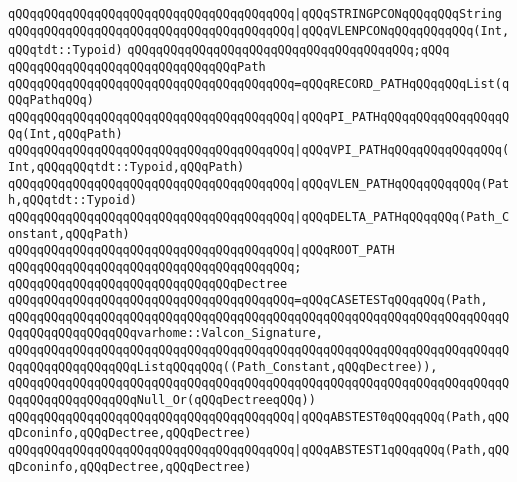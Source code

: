 \verb|qQQqqQQqqQQqqQQqqQQqqQQqqQQqqQQqqQQqqQQq|\verb#|qQQqSTRINGPCONqQQqqQQqString#\newline
\verb|qQQqqQQqqQQqqQQqqQQqqQQqqQQqqQQqqQQqqQQq|\verb#|qQQqVLENPCONqQQqqQQqqQQq(Int,qQQqtdt::Typoid)#\newline
\verb|qQQqqQQqqQQqqQQqqQQqqQQqqQQqqQQqqQQqqQQq;qQQq|\newline
\newline
\verb|qQQqqQQqqQQqqQQqqQQqqQQqqQQqqQQqPath|\newline
\verb|qQQqqQQqqQQqqQQqqQQqqQQqqQQqqQQqqQQqqQQq=qQQqRECORD_PATHqQQqqQQqList(qQQqPathqQQq)|\newline
\verb|qQQqqQQqqQQqqQQqqQQqqQQqqQQqqQQqqQQqqQQq|\verb#|qQQqPI_PATHqQQqqQQqqQQqqQQqqQQq(Int,qQQqPath)#\newline
\verb|qQQqqQQqqQQqqQQqqQQqqQQqqQQqqQQqqQQqqQQq|\verb#|qQQqVPI_PATHqQQqqQQqqQQqqQQq(Int,qQQqqQQqtdt::Typoid,qQQqPath)#\newline
\verb|qQQqqQQqqQQqqQQqqQQqqQQqqQQqqQQqqQQqqQQq|\verb#|qQQqVLEN_PATHqQQqqQQqqQQq(Path,qQQqtdt::Typoid)#\newline
\verb|qQQqqQQqqQQqqQQqqQQqqQQqqQQqqQQqqQQqqQQq|\verb#|qQQqDELTA_PATHqQQqqQQq(Path_Constant,qQQqPath)#\newline
\verb|qQQqqQQqqQQqqQQqqQQqqQQqqQQqqQQqqQQqqQQq|\verb#|qQQqROOT_PATH#\newline
\verb|qQQqqQQqqQQqqQQqqQQqqQQqqQQqqQQqqQQqqQQq;|\newline
\newline
\verb|qQQqqQQqqQQqqQQqqQQqqQQqqQQqqQQqDectree|\newline
\verb|qQQqqQQqqQQqqQQqqQQqqQQqqQQqqQQqqQQqqQQq=qQQqCASETESTqQQqqQQq(Path,|\newline
\verb|qQQqqQQqqQQqqQQqqQQqqQQqqQQqqQQqqQQqqQQqqQQqqQQqqQQqqQQqqQQqqQQqqQQqqQQqqQQqqQQqqQQqqQQqvarhome::Valcon_Signature,|\newline
\verb|qQQqqQQqqQQqqQQqqQQqqQQqqQQqqQQqqQQqqQQqqQQqqQQqqQQqqQQqqQQqqQQqqQQqqQQqqQQqqQQqqQQqqQQqListqQQqqQQq((Path_Constant,qQQqDectree)),|\newline
\verb|qQQqqQQqqQQqqQQqqQQqqQQqqQQqqQQqqQQqqQQqqQQqqQQqqQQqqQQqqQQqqQQqqQQqqQQqqQQqqQQqqQQqqQQqNull_Or(qQQqDectreeqQQq))|\newline
\verb|qQQqqQQqqQQqqQQqqQQqqQQqqQQqqQQqqQQqqQQq|\verb#|qQQqABSTEST0qQQqqQQq(Path,qQQqDconinfo,qQQqDectree,qQQqDectree)#\newline
\verb|qQQqqQQqqQQqqQQqqQQqqQQqqQQqqQQqqQQqqQQq|\verb#|qQQqABSTEST1qQQqqQQq(Path,qQQqDconinfo,qQQqDectree,qQQqDectree)#\newline
